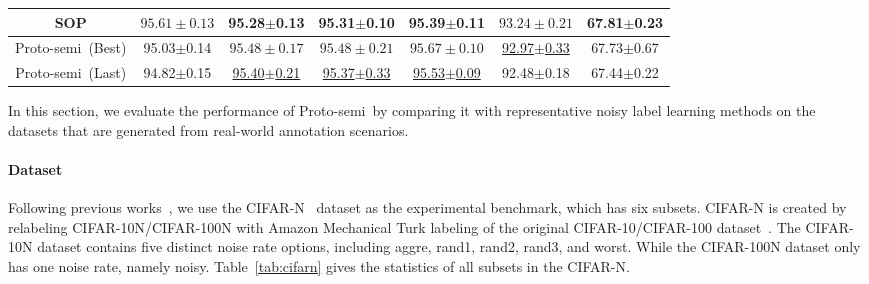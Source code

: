 \documentclass[letterpaper]{article} %
\newcommand{\method}{Proto-semi}
\begin{document}
\begin{table}[h]
\begin{tabular}{c|ccccc|c}
    SOP & $\mathbf{95.61\pm0.13}$ & 95.28$\pm$0.13 & 95.31$\pm$0.10 &  95.39$\pm$0.11 & $\mathbf{93.24\pm0.21}$ & 67.81$\pm$0.23\\
    \midrule
    \method\ (Best) & 95.03$\pm$0.14 & $\mathbf{95.48\pm0.17}$ & $\mathbf{95.48\pm0.21}$ & $\mathbf{95.67\pm0.10}$ &  \underline{92.97$\pm$0.33} & 67.73$\pm$0.67\\
    \method\ (Last)& 94.82$\pm$0.15 &  \underline{95.40$\pm$0.21}  &  \underline{95.37$\pm$0.33} &  \underline{95.53$\pm$0.09} & 92.48$\pm$0.18 & 67.44$\pm$0.22 \\
  \bottomrule
  \end{tabular}
\end{table}


In this section, we evaluate the performance of \method\ by comparing it with representative noisy label learning methods on the datasets that are generated from real-world annotation scenarios.

\paragraph{Dataset}

\begin{table}[h]
  \caption{The statistics of CIFAR-N dataset}
  \label{tab:cifarn}
  \centering
\end{table}
Following previous works~\cite{DBLP:conf/icml/LiuZQY22}, we use the CIFAR-N~\cite{DBLP:conf/iclr/WeiZ0L0022} dataset as the experimental benchmark, which has six subsets. CIFAR-N is created by relabeling CIFAR-10N/CIFAR-100N with Amazon Mechanical Turk labeling of the original CIFAR-10/CIFAR-100 dataset~\cite{krizhevsky2009learning}. The CIFAR-10N dataset contains five distinct noise rate options, including aggre, rand1, rand2, rand3, and worst. While the CIFAR-100N dataset only has one noise rate, namely noisy. Table~\ref{tab:cifarn} gives the statistics of all subsets in the CIFAR-N.
\end{document}
